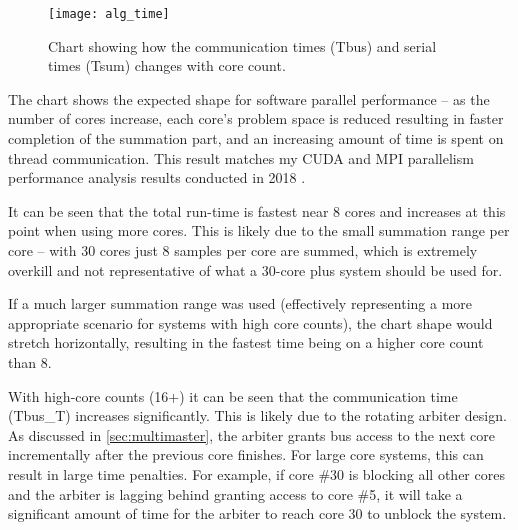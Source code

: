 \begin{figure}[h]
\centering
\texttt{[image: alg\_time]}
\caption{Chart showing how the communication times (Tbus) and serial times (Tsum) changes with core count.}
\label{fig:alg_time}
\end{figure}

The chart shows the expected shape for software parallel performance -- as the number of cores increase, each core's problem space is reduced resulting in faster completion of the summation part, and an increasing amount of time is spent on thread communication. This result matches my CUDA and MPI parallelism performance analysis results conducted in 2018 \cite{soft354}.

It can be seen that the total run-time is fastest near 8 cores and increases at this point when using more cores. This is likely due to the small summation range per core -- with 30 cores just 8 samples per core are summed, which is extremely overkill and not representative of what a 30-core plus system should be used for.

If a much larger summation range was used (effectively representing a more appropriate scenario for systems with high core counts), the chart shape would stretch horizontally, resulting in the fastest time being on a higher core count than 8.

With high-core counts (16+) it can be seen that the communication time (Tbus\_T) increases significantly. This is likely due to the rotating arbiter design. As discussed in \cref{sec:multimaster}, the arbiter grants bus access to the next core incrementally after the previous core finishes. For large core systems, this can result in large time penalties. For example, if core \#30 is blocking all other cores and the arbiter is lagging behind granting access to core \#5, it will take a significant amount of time for the arbiter to reach core 30 to unblock the system.

